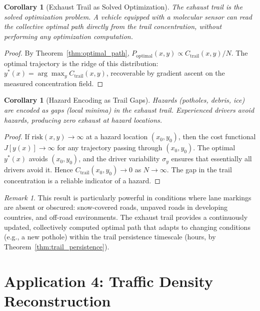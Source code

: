 \documentclass[11pt,twocolumn,a4paper]{article}
\theoremstyle{plain}
\newtheorem{corollary}[theorem]{Corollary}
\theoremstyle{definition}
\theoremstyle{remark}
\newtheorem{remark}[theorem]{Remark}
\newcommand{\Ctrail}{C_{\mathrm{trail}}}
\begin{document}
\begin{corollary}[Exhaust Trail as Solved Optimization]
\label{cor:solved_optimization}
The exhaust trail \emph{is} the solved optimization problem. A vehicle equipped with a molecular sensor can read the collective optimal path directly from the trail concentration, without performing any optimization computation.
\end{corollary}

\begin{proof}
By Theorem~\ref{thm:optimal_path}, $P_{\mathrm{optimal}}(x,y) \propto \Ctrail(x,y)/N$. The optimal trajectory is the ridge of this distribution: $y^*(x) = \arg\max_y \Ctrail(x,y)$, recoverable by gradient ascent on the measured concentration field.
\end{proof}

\begin{corollary}[Hazard Encoding as Trail Gaps]
\label{cor:hazard_gaps}
Hazards (potholes, debris, ice) are encoded as gaps (local minima) in the exhaust trail. Experienced drivers avoid hazards, producing zero exhaust at hazard locations.
\end{corollary}

\begin{proof}
If $\mathrm{risk}(x,y) \to \infty$ at a hazard location $(x_0, y_0)$, then the cost functional $J[y(x)] \to \infty$ for any trajectory passing through $(x_0, y_0)$. The optimal $y^*(x)$ avoids $(x_0, y_0)$, and the driver variability $\sigma_y$ ensures that essentially all drivers avoid it. Hence $\Ctrail(x_0, y_0) \to 0$ as $N \to \infty$. The gap in the trail concentration is a reliable indicator of a hazard.
\end{proof}

\begin{remark}
This result is particularly powerful in conditions where lane markings are absent or obscured: snow-covered roads, unpaved roads in developing countries, and off-road environments. The exhaust trail provides a continuously updated, collectively computed optimal path that adapts to changing conditions (e.g., a new pothole) within the trail persistence timescale (hours, by Theorem~\ref{thm:trail_persistence}).
\end{remark}


\section{Application 4: Traffic Density Reconstruction}
\label{sec:traffic_density}
\end{document}
